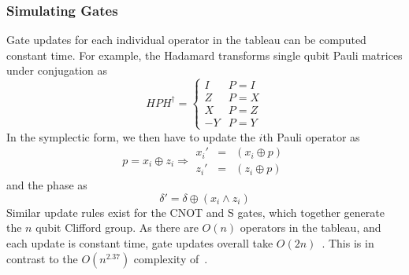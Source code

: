 \subsubsection*{Simulating Gates}
Gate updates for each individual operator in the tableau can be computed constant time. For example, the Hadamard transforms single qubit Pauli matrices under conjugation as
\begin{equation}
    HPH^{\dagger} = \begin{cases}
        I & P=I\\
        Z & P=X\\
        X & P=Z\\
        -Y & P=Y
        \end{cases}
\end{equation}
In the symplectic form, we then have to update the $i$th Pauli operator as
\begin{equation}
    p = x_{i} \oplus z_{i} \Rightarrow \begin{array}{lcr}
    x_{i}' & = & \left(x_{i}\oplus p\right)\\
    z_{i}' & = & \left(z_{i}\oplus p\right) 
    \end{array}
\end{equation}
and the phase as
\begin{equation}
\delta' = \delta \oplus \left(x_{i}\wedge z_{i}\right)
\end{equation}
Similar update rules exist for the CNOT and S gates, which together generate the $n$ qubit Clifford group. As there are $O(n)$ operators in the tableau, and each update is constant time, gate updates overall take $O\left(2n\right)$~\cite{Aaronson2004}. This is in contrast to the $O(n^{2.37})$ complexity of~\cite{Dehaene2003}.
